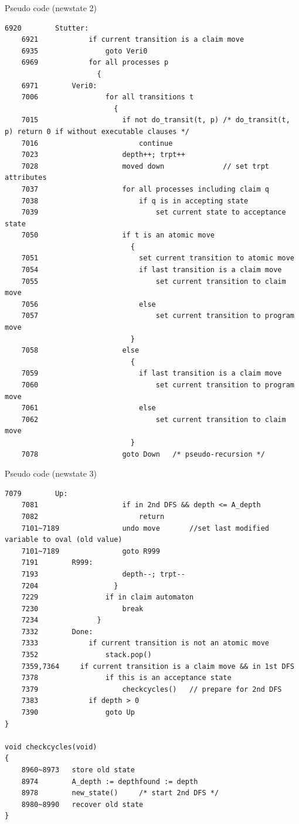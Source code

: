 \documentclass[12pt]{beamer}
\begin{document}
\begin{frame}[fragile]{Pseudo code (newstate 2)}
\begin{lstlisting}[basicstyle=\tiny]
    6920        Stutter:
    6921            if current transition is a claim move
    6935                goto Veri0
    6969            for all processes p
                      {
    6971        Veri0:
    7006                for all transitions t
                          {
    7015                    if not do_transit(t, p) /* do_transit(t, p) return 0 if without executable clauses */
    7016                        continue
    7023                    depth++; trpt++
    7028                    moved down              // set trpt attributes
    7037                    for all processes including claim q
    7038                        if q is in accepting state
    7039                            set current state to acceptance state
    7050                    if t is an atomic move
                              {
    7051                        set current transition to atomic move
    7054                        if last transition is a claim move
    7055                            set current transition to claim move
    7056                        else
    7057                            set current transition to program move
                              }
    7058                    else
                              {
    7059                        if last transition is a claim move
    7060                            set current transition to program move
    7061                        else
    7062                            set current transition to claim move
                              }
    7078                    goto Down   /* pseudo-recursion */ 
\end{lstlisting}
\end{frame}

\begin{frame}[fragile]{Pseudo code (newstate 3)}
\begin{lstlisting}[basicstyle=\tiny]
    7079        Up:
    7081                    if in 2nd DFS && depth <= A_depth
    7082                        return
    7101~7189               undo move       //set last modified variable to oval (old value)
    7101~7189               goto R999
    7191        R999:
    7193                    depth--; trpt--
    7204                  }
    7229                if in claim automaton
    7230                    break
    7234              }
    7332        Done:
    7333            if current transition is not an atomic move
    7352                stack.pop()
    7359,7364     if current transition is a claim move && in 1st DFS
    7378                if this is an acceptance state
    7379                    checkcycles()   // prepare for 2nd DFS
    7383            if depth > 0
    7390                goto Up 
}

void checkcycles(void)
{
    8960~8973   store old state
    8974        A_depth := depthfound := depth
    8978        new_state()     /* start 2nd DFS */
    8980~8990   recover old state
}
\end{lstlisting}
\end{frame}
\end{document}
